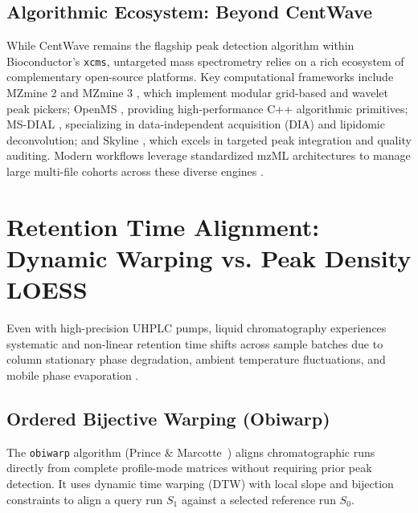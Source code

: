 \documentclass[11pt,twoside,openright]{book}
\begin{document}
\subsection{Algorithmic Ecosystem: Beyond CentWave}
While CentWave remains the flagship peak detection algorithm within Bioconductor's \texttt{xcms}, untargeted mass spectrometry relies on a rich ecosystem of complementary open-source platforms. Key computational frameworks include MZmine 2 and MZmine 3 \cite{pluskal2010mzmine, schmid2023mzmine}, which implement modular grid-based and wavelet peak pickers; OpenMS \cite{rost2016openms}, providing high-performance C++ algorithmic primitives; MS-DIAL \cite{tsugawa2015msdial}, specializing in data-independent acquisition (DIA) and lipidomic deconvolution; and Skyline \cite{maclean2010skyline}, which excels in targeted peak integration and quality auditing. Modern workflows leverage standardized mzML architectures to manage large multi-file cohorts across these diverse engines \cite{rivas2016moving, chambers2012cross}.

\section{Retention Time Alignment: Dynamic Warping vs. Peak Density LOESS}

Even with high-precision UHPLC pumps, liquid chromatography experiences systematic and non-linear retention time shifts across sample batches due to column stationary phase degradation, ambient temperature fluctuations, and mobile phase evaporation \cite{mahieu2016warping, dunn2011mass}. 

\subsection{Ordered Bijective Warping (Obiwarp)}

The \texttt{obiwarp} algorithm (Prince \& Marcotte~\cite{prince2006chromatographic}) aligns chromatographic runs directly from complete profile-mode matrices without requiring prior peak detection. It uses dynamic time warping (DTW) with local slope and bijection constraints to align a query run $S_1$ against a selected reference run $S_0$.
\end{document}
